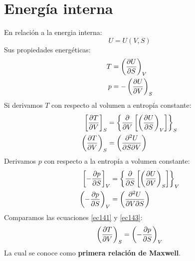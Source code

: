 \documentclass[../main]{subfiles}
\begin{document}
\section{Energía interna}
En relación a la energia interna:
\begin{equation}
    U=U(V,S)
\end{equation}
Sus propiedades energéticas:
\begin{align}
    T&=\left( \pdv{U}{S} \right)_V \\
    p&=-\left( \pdv{U}{V}\right)_S
\end{align}
Si derivamos $T$ con respecto al volumen a entropía constante:
\begin{align}
    \left[ \pdv{T}{V} \right]_S&=\left\{ \pdv{}{V}\left[\left( \pdv{U}{S}\right)_V \right] \right\}_S \\
    \left(\pdv{T}{V}\right)_S&=\left(\pdv{^2 U}{S \partial V}\right)
    \label{ec141}
\end{align}
Derivamos $p$ con respecto a la entropía a volumen constante:
\begin{align}
    \left[ - \pdv{p}{S}\right]_V&=\left\{ \pdv{}{S}\left[\left( \pdv{U}{V}\right)_S \right] \right\}_V \\
    \left( - \pdv{p}{S}\right)_V&=\left( \pdv{^2 U}{V \partial S}\right)
    \label{ec143}
\end{align}
Comparamos las ecuaciones \eqref{ec141} y \eqref{ec143}:
\begin{equation}
    \left(\pdv{T}{V}\right)_S=\left( - \pdv{p}{S}\right)_V
\end{equation}
La cual se conoce como \textbf{primera relación de Maxwell}.
\end{document}
